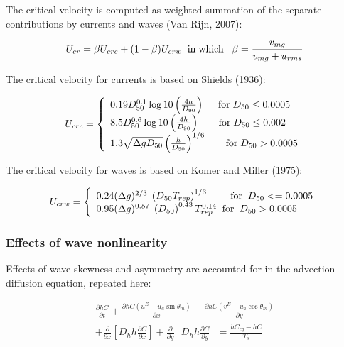 \documentclass{article}
\begin{document}
\noindent The critical velocity is computed as weighted summation of the separate contributions by currents and waves (Van Rijn, 2007):

\noindent 
\begin{equation} \label{2.96)} 
U_{cr} =\beta U_{crc} +(1-\beta )U_{crw} {\rm \; \; in\; which\; \; \; }\beta =\frac{v_{mg} }{v_{mg} +u_{rms} }  
\end{equation} 


\noindent The critical velocity for currents is based on Shields (1936):

\noindent 
\begin{equation} \label{2.97)} 
U_{crc} =\left\{\begin{array}{l} {0.19D_{50}^{0.1} \log 10\left(\frac{4h}{D_{90} } \right){\rm \; \; \; \; \; for\; }D_{50} \le 0.0005} \\ {8.5D_{50}^{0.6} \log 10\left(\frac{4h}{D_{90} } \right){\rm \; \; \; \; \; \; \; for\; }D_{50} \le 0.002} \\ {1.3\sqrt{\Delta gD_{50} } \left(\frac{h}{D_{50} } \right)^{1/6} {\rm \; \; \; \; \; \; \; for\; }D_{50} >0.0005} \end{array}\right.  
\end{equation} 


\noindent The critical velocity for waves is based on Komer and Miller (1975):

\noindent 
\begin{equation} \label{2.98)} 
U_{crw} =\left\{\begin{array}{l} {0.24(\Delta g)^{2/3} {\rm \; }\left(D_{50} T_{rep} \right)^{1/3} {\rm \; \; \; \; \; \; \; \; for\; \; }D_{50} <=0.0005} \\ {0.95(\Delta g)^{0.57} {\rm \; }\left(D_{50} \right)^{0.43} T_{rep} ^{0.14} {\rm \; \; for\; \; }D_{50} >0.0005} \end{array}\right.  
\end{equation} 


\subsubsection{ Effects of wave nonlinearity }

\noindent Effects of wave skewness and asymmetry are accounted for in the advection-diffusion equation, repeated here:

\noindent 
\begin{equation} \label{2.99)} 
\begin{array}{c} {\frac{\partial hC}{\partial t} +\frac{\partial hC(u^{E} -u_{a} \sin \theta _{m} )}{\partial x} +\frac{\partial hC(v^{E} -u_{a} \cos \theta _{m} )}{\partial y} } \\ {+\frac{\partial }{\partial x} \left[D_{h} h\frac{\partial C}{\partial x} \right]+\frac{\partial }{\partial y} \left[D_{h} h\frac{\partial C}{\partial y} \right]=\frac{hC_{eq} -hC}{T_{s} } } \end{array} 
\end{equation} 
\end{document}
